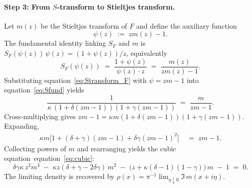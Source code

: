 \documentclass{article}
\def\eqref#1{equation~\ref{#1}}
\begin{document}
\paragraph{Step 3: From $S$-transform to Stieltjes transform.}
Let $m(z)$ be the Stieltjes transform of $F$ and define the auxiliary function
\[
    \psi(z) \;:=\; z m(z) - 1.
\]
The fundamental identity linking $S_F$ and $m$ is $S_F(\psi(z))\,\psi(z) = (1+\psi(z))/z$, equivalently
\begin{equation}\label{eq:Sfund}
    S_F(\psi(z)) \;=\; \frac{1+\psi(z)}{\psi(z)\cdot z} \;=\; \frac{m(z)}{zm(z)-1}.
\end{equation}
Substituting \eqref{eq:Stransform_F} with $\psi=zm-1$ into \eqref{eq:Sfund} yields
\[
    \frac{1}{\kappa\,(1+\delta(zm-1))(1+\gamma(zm-1))} \;=\; \frac{m}{zm-1}.
\]
Cross-multiplying gives $zm-1=\kappa m(1+\delta(zm-1))(1+\gamma(zm-1))$. Expanding,
\begin{align*}
    \kappa m\Big[1+(\delta+\gamma)(zm-1)+\delta\gamma(zm-1)^2\Big]
    &\;=\; zm-1.
\end{align*}
Collecting powers of $m$ and rearranging yields the cubic equation~\eqref{eq:cubic}:
\begin{equation}\label{eq:cubic_app}
    \delta\gamma\kappa\, z^2 m^3 \;-\; \kappa z(\delta+\gamma-2\delta\gamma)\,m^2 \;-\;\big(z+\kappa(\delta-1)(1-\gamma)\big)\,m \;-\; 1 \;=\; 0.
\end{equation}
The limiting density is recovered by $\rho(x)=\pi^{-1}\lim_{\eta\downarrow0}\Im\,m(x+i\eta)$.
\end{document}
